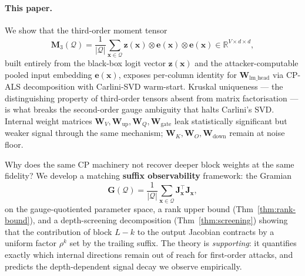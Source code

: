 \documentclass{article}
\newcommand{\R}{\mathbb{R}}
\newcommand{\cQ}{\mathcal{Q}}
\newcommand{\bz}{\mathbf{z}}
\newcommand{\bx}{\mathbf{x}}
\newcommand{\bW}{\mathbf{W}}
\newcommand{\bJ}{\mathbf{J}}
\newcommand{\bG}{\mathbf{G}}
\newcommand{\bM}{\mathbf{M}}
\newcommand{\be}{\mathbf{e}}
\begin{document}
\paragraph{This paper.} We show that the third-order moment tensor
\begin{equation}\label{eq:m3-intro}
 \bM_3(\cQ) = \frac{1}{|\cQ|}\sum_{\bx \in \cQ} \bz(\bx) \otimes \be(\bx) \otimes \be(\bx) \in \R^{V \times d \times d},
\end{equation}
built entirely from the black-box logit vector $\bz(\bx)$ and the attacker-computable pooled input embedding $\be(\bx)$, exposes per-column identity for $\bW_{\text{lm\_head}}$ via CP-ALS decomposition with Carlini-SVD warm-start. Kruskal uniqueness --- the distinguishing property of third-order tensors absent from matrix factorisation --- is what breaks the second-order gauge ambiguity that halts Carlini's SVD. Internal weight matrices $\bW_V,\bW_\text{up},\bW_Q,\bW_\text{gate}$ leak statistically significant but weaker signal through the same mechanism; $\bW_K, \bW_O, \bW_\text{down}$ remain at noise floor.

Why does the same CP machinery not recover deeper block weights at the same fidelity? We develop a matching \textbf{suffix observability} framework: the Gramian
\begin{equation}\label{eq:gramian-intro}
 \bG(\cQ) = \frac{1}{|\cQ|}\sum_{\bx \in \cQ} \bJ_{\bx}^\top \bJ_{\bx},
\end{equation}
on the gauge-quotiented parameter space, a rank upper bound (Thm~\ref{thm:rank-bound}), and a depth-screening decomposition (Thm~\ref{thm:screening}) showing that the contribution of block $L-k$ to the output Jacobian contracts by a uniform factor $\rho^k$ set by the trailing suffix. The theory is \emph{supporting}: it quantifies exactly which internal directions remain out of reach for first-order attacks, and predicts the depth-dependent signal decay we observe empirically.
\end{document}
